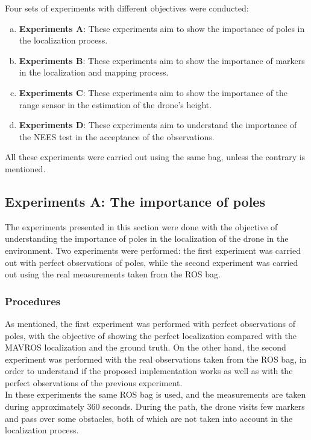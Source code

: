 Four sets of experiments with different objectives were conducted:
\begin{enumerate}[a)]
    \item{\textbf{Experiments A}: These experiments aim to show the importance of poles in the localization process.}
    \item{\textbf{Experiments B}: These experiments aim to show the importance of markers in the localization and mapping process.}
    \item{\textbf{Experiments C}: These experiments aim to show the importance of the range sensor in the estimation of the drone's height.}
    \item{\textbf{Experiments D}: These experiments aim to understand the importance of the \ac{NEES} test in the acceptance of the observations.}
\end{enumerate}
All these experiments were carried out using the same bag, unless the contrary is mentioned.

\subsection{Experiments A: The importance of poles}
\label{subsec:chapter3:simulation:a}
The experiments presented in this section were done with the objective of understanding the importance of poles in the localization of the drone in the environment. Two experiments were performed: the first experiment was carried out with perfect observations of poles, while the second experiment was carried out using the real measurements taken from the \ac{ROS} bag.

\subsubsection{Procedures}
\label{subsubsec:chapter3:simulation:a:procedures}
As mentioned, the first experiment was performed with perfect observations of poles, with the objective of showing the perfect localization compared with the MAVROS localization and the ground truth. On the other hand, the second experiment was performed with the real observations taken from the \ac{ROS} bag, in order to understand if the proposed implementation works as well as with the perfect observations of the previous experiment.\\

In these experiments the same \ac{ROS} bag is used, and the measurements are taken during approximately 360 seconds. During the path, the drone visits few markers and pass over some obstacles, both of which are not taken into account in the localization process.


